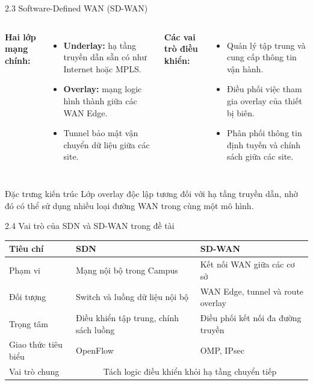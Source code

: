 \begin{frame}{2.3 Software-Defined WAN (SD-WAN)}
    \begin{columns}[T]
        \textbf{Hai lớp mạng chính:}
        \begin{itemize}
            \item \textbf{Underlay:} hạ tầng truyền dẫn sẵn có như Internet hoặc MPLS.
            \item \textbf{Overlay:} mạng logic hình thành giữa các WAN Edge.
            \item Tunnel bảo mật vận chuyển dữ liệu giữa các site.
        \end{itemize}

        \textbf{Các vai trò điều khiển:}
        \begin{itemize}
            \item Quản lý tập trung và cung cấp thông tin vận hành.
            \item Điều phối việc tham gia overlay của thiết bị biên.
            \item Phân phối thông tin định tuyến và chính sách giữa các site.
        \end{itemize}
    \end{columns}
    \vspace{0.15cm}
    \begin{block}{Đặc trưng kiến trúc}
        Lớp overlay độc lập tương đối với hạ tầng truyền dẫn, nhờ đó có thể sử dụng nhiều loại đường WAN trong cùng một mô hình.
    \end{block}
\end{frame}

\begin{frame}{2.4 Vai trò của SDN và SD-WAN trong đề tài}
    \begin{table}
        \centering
        \small
        \renewcommand{\arraystretch}{1.35}
        \begin{tabular}{|p{}|p{}|p{}|}
            \hline
            \rowcolor{primaryDark!15}
            \textbf{Tiêu chí} & \textbf{SDN} & \textbf{SD-WAN} \\
            \hline
            Phạm vi & Mạng nội bộ trong Campus & Kết nối WAN giữa các cơ sở \\
            \hline
            Đối tượng & Switch và luồng dữ liệu nội bộ & WAN Edge, tunnel và route overlay \\
            \hline
            Trọng tâm & Điều khiển tập trung, chính sách luồng & Điều phối kết nối đa đường truyền \\
            \hline
            Giao thức tiêu biểu & OpenFlow & OMP, IPsec \\
            \hline
            Vai trò chung & \multicolumn{2}{c|}{Tách logic điều khiển khỏi hạ tầng chuyển tiếp} \\
            \hline
        \end{tabular}
    \end{table}
\end{frame}

